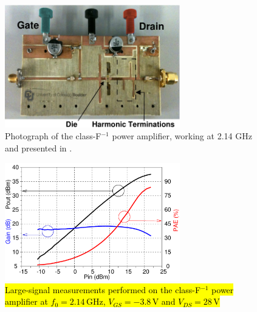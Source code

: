 \begin{figure}[ht!]
\centering
\includegraphics[width=3.0in]{pdf/08.pdf}
\caption{Photograph of the class-F$^{-1}$ power amplifier, working at 2.14 GHz and presented in \cite{gan_pa_letter}.}
\label{amplifier}
\end{figure}


\begin{figure}
  \begin{center}
  \includegraphics[width=3.0in]{pdf/09.pdf}
  \caption{\hl{Large-signal measurements performed on the class-F$^{-1}$ power amplifier at $f_0=2.14$\,GHz, $V_{GS}=-3.8$\,V and $V_{DS}=28$\,V}}
\label{PA_meas}
  \end{center}
\end{figure}









